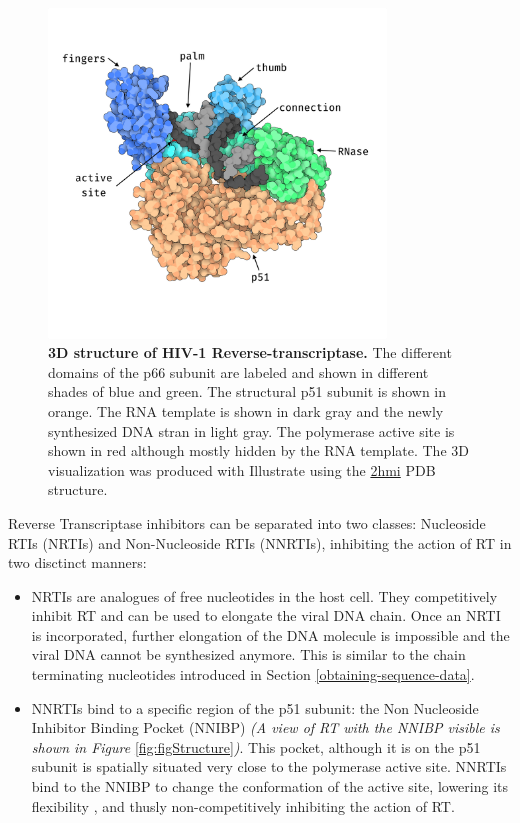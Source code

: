 \documentclass[
  11pt,
  twoside]{scrbook}
\newcommand{\extcaption}[2]{
    \caption[#1]{
        \textbf{#1}\newline
        #2
    }
}
\begin{document}
\begin{figure} 
  \centering 
  \includegraphics[width=0.8\textwidth]{./figures/HIV-Intro/rt.png}      \extcaption{3D structure of HIV-1 Reverse-transcriptase.}{The different domains of the p66 subunit are labeled and shown in different shades of blue and green. The structural p51 subunit is shown in orange. The RNA template is shown in dark gray and the newly synthesized DNA stran in light gray. The polymerase active site is shown in red although mostly hidden by the RNA template. The 3D visualization was produced with Illustrate \autocite{goodsellIllustrateSoftwareBiomolecular2019} using the \href{https://www.rcsb.org/structure/2HMI}{2hmi} PDB structure.}       
  \label{fig:rtStruct} 
\end{figure}

Reverse Transcriptase inhibitors can be separated into two classes: Nucleoside RTIs (NRTIs) and Non-Nucleoside RTIs (NNRTIs), inhibiting the action of RT in two disctinct manners:

\begin{itemize}
\item
  NRTIs are analogues of free nucleotides in the host cell. They competitively inhibit RT and can be used to elongate the viral DNA chain. Once an NRTI is incorporated, further elongation of the DNA molecule is impossible and the viral DNA cannot be synthesized anymore. This is similar to the chain terminating nucleotides introduced in Section \ref{obtaining-sequence-data}.
\item
  NNRTIs bind to a specific region of the p51 subunit: the Non Nucleoside Inhibitor Binding Pocket (NNIBP) \emph{(A view of RT with the NNIBP visible is shown in Figure} \ref{fig:figStructure}\emph{)}. This pocket, although it is on the p51 subunit is spatially situated very close to the polymerase active site. NNRTIs bind to the NNIBP to change the conformation of the active site, lowering its flexibility \autocite{esnoufUniqueFeaturesStructure1997}, and thusly non-competitively inhibiting the action of RT.
\end{itemize}
\end{document}
